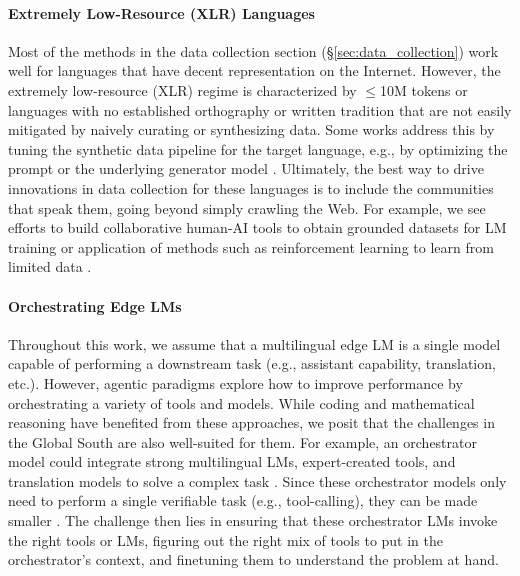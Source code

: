 \documentclass[11pt,a4paper]{article}
\begin{document}
\paragraph{Extremely Low-Resource (XLR) Languages}
Most of the methods in the data collection section (\S\ref{sec:data_collection}) work well for languages that have decent representation on the Internet.
However, the extremely low-resource (XLR) regime is characterized by $\leq$10M tokens \citep{conneau-etal-2020-unsupervised} or languages with no established orthography or written tradition \citep{pava2026digitization}
that are not easily mitigated by naively curating or synthesizing data.
Some works address this by tuning the synthetic data pipeline for the target language, e.g., by optimizing the prompt \citep{mora2025artaskingmultilingualprompt} or the underlying generator model \citep{mitra2024agentinstructgenerativeteachingagentic}.
Ultimately, the best way to drive innovations in data collection for these languages is to include the communities that speak them, going beyond simply crawling the Web.
For example, we see efforts to build collaborative human-AI tools to obtain grounded datasets for LM training \citep{f-p-dossou-aidasso-2025-towards} or application of methods such as reinforcement learning to learn from limited data \citep{sutawika2026gainedtranslationprivilegedpairwise,attia2026improvinglowresourcemachinetranslation}.

\paragraph{Orchestrating Edge LMs}
Throughout this work, we assume that a multilingual edge LM is a single model capable of performing a downstream task (e.g., assistant capability, translation, etc.).
However, agentic paradigms explore how to improve performance by orchestrating a variety of tools and models.
While coding and mathematical reasoning have benefited from these approaches, we posit that the challenges in the Global South are also well-suited for them.
For example, an orchestrator model could integrate strong multilingual LMs, expert-created tools, and translation models to solve a complex task \citep{nielsen2026learning}.
Since these orchestrator models only need to perform a single verifiable task (e.g., tool-calling), they can be made smaller \citep{erdogan-etal-2024-tinyagent,belcak2025smalllanguagemodelsfuture}.
The challenge then lies in ensuring that these orchestrator LMs invoke the right tools or LMs, figuring out the right mix of tools to put in the orchestrator's context, and finetuning them to understand the problem at hand.
\end{document}
